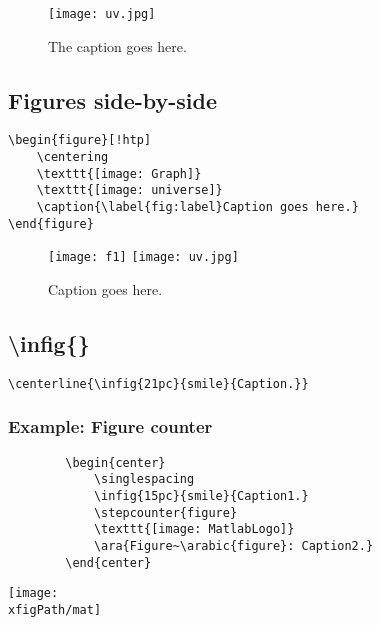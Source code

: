 \begin{figure}[!ht] 
	\centering
	\texttt{[image: uv.jpg]}
	\caption{The caption goes here.} 
	\label{fig:1}
\end{figure}


\subsection{Figures side-by-side}

\begin{SBN}
\color{blue}
\begin{verbatim}
\begin{figure}[!htp] 
	\centering
	\texttt{[image: Graph]}
	\texttt{[image: universe]}
	\caption{\label{fig:label}Caption goes here.} 
\end{figure}    
\end{verbatim}
\end{SBN}


\medskip
\begin{figure}[!htp] 
	\centering
	\texttt{[image: f1]}
	\texttt{[image: uv.jpg]}
	\caption{\label{fig:1000}Caption goes here.}
	
\end{figure} 


\subsection{\textbackslash{}infig\{\}}
\begin{SBN}
{\color{blue}\verb!\centerline{\infig{21pc}{smile}{Caption.}}!}
\end{SBN}

\np
\subsubsection{Example: Figure counter}
\begin{SBN}
    {\color{blue}
    \begin{verbatim}
    	\begin{center}
    		\singlespacing
    		\infig{15pc}{smile}{Caption1.}
    		\stepcounter{figure}
    		\texttt{[image: MatlabLogo]}
    		\ara{Figure~\arabic{figure}: Caption2.}
    	\end{center}
    \end{verbatim}
    }
\end{SBN}
\bigskip
\begin{center}
	\singlespacing
	\vspace*{24pt}
	\texttt{[image: \\xfigPath/mat]}
\end{center}


